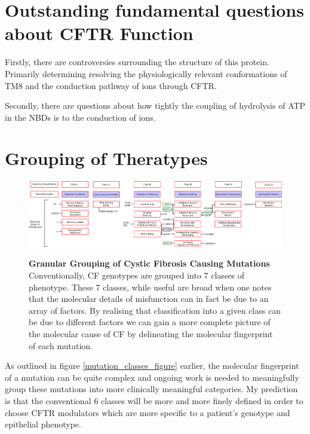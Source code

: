 \section{Outstanding fundamental questions about CFTR Function}
Firstly, there are controversies surrounding the structure of this protein. Primarily determining resolving the physiologically relevant conformations of TM8 and the conduction pathway of ions through CFTR.

Secondly, there are questions about how tightly the coupling of hydrolysis of ATP in the NBDs is to the conduction of ions.

\section{Grouping of Theratypes}
\begin{landscape}
\begin{figure}
	\begin{center}
	\includegraphics[width=1.5\textwidth]{figures/classes_mutations.pdf}\\
	\end{center}
	\captionsetup{singlelinecheck = false, justification=raggedright}
	\caption[Granular grouping of CF pathogenesis]{\textbf{Granular Grouping of Cystic Fibrosis Causing Mutations}{ Conventionally, CF genotypes are grouped into 7 classes of phenotype. These 7 classes, while useful are broad when one notes that the molecular details of misfunction can in fact be due to an array of factors. By realising that classification into a given class can be due to different factors we can gain a more complete  picture of the molecular cause of CF by delineating the molecular fingerprint of each mutation.}}

\end{figure}
\end{landscape}

As outlined in figure \ref{mutation_classes_figure} earlier, the molecular fingerprint of a mutation can be quite complex and ongoing work is needed to meaningfully group these mutations into more clinically meaningful categories. My prediction is that the conventional 6 classes will be more and more finely defined in order to choose CFTR modulators which are more specific to a patient's genotype and epithelial phenotype. 

